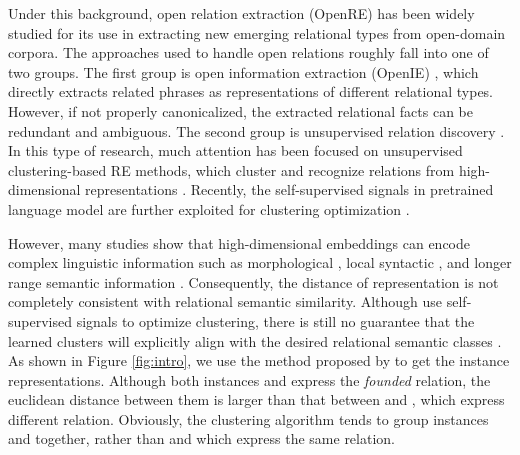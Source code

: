 \documentclass[11pt]{article}
\begin{document}
    Under this background, open relation extraction (OpenRE) has been widely studied for its use in extracting new emerging relational types from open-domain corpora. The approaches used to handle open relations roughly fall into one of two groups. The first group is open information extraction (OpenIE) \citep{10.1145/1409360.1409378,yates-etal-2007-textrunner,fader-etal-2011-identifying}, which directly extracts related phrases as representations of different relational types. However, if not properly canonicalized, the extracted relational facts can be redundant and ambiguous. 
The second group is unsupervised relation discovery \citep{yao-etal-2011-structured,shinyama-sekine-2006-preemptive,simon-etal-2019-unsupervised}.
In this type of research, much attention has been focused on unsupervised clustering-based RE methods, which cluster and recognize relations from high-dimensional representations \citep{10.1007/978-3-319-70407-4_3}. Recently, the self-supervised signals in pretrained language model are further exploited for clustering optimization \citep{hu2020selfore}.

    However, many studies show that high-dimensional embeddings can encode complex linguistic information such as morphological \citep{peters-etal-2018-dissecting}, local syntactic \citep{hewitt-manning-2019-structural}, and longer range semantic information \citep{jawahar-etal-2019-bert}. Consequently, the distance of representation is not completely consistent with relational semantic similarity. Although \citet{hu2020selfore} use self-supervised signals to optimize clustering, there is still no guarantee that the learned clusters will explicitly align with the desired relational semantic classes \citep{10.5555/2968618.2968683}. As shown in Figure \ref{fig:intro}, we use the method proposed by \citet{hu2020selfore} to get the instance representations. Although both instances  and  express the \textit{founded} relation, the euclidean distance between them is larger than that between  and , which express different relation. Obviously, the clustering algorithm tends to group instances  and  together, rather than  and  which express the same relation. 
\end{document}
